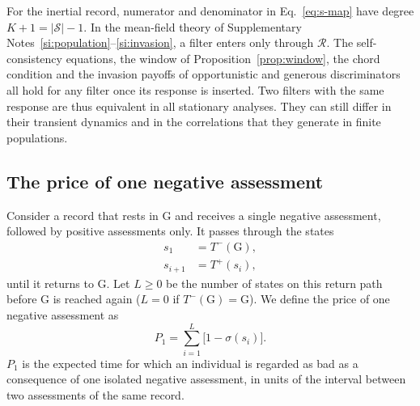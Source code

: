\documentclass[10pt]{wlscirep}
\newcommand{\Rmap}{\mathscr{R}}            %
\newcommand{\st}[1]{\mathrm{#1}}           %
\newcommand{\Pone}{P_{1}}                  %
\theoremstyle{plain}
\theoremstyle{remark}
\begin{document}
For the inertial record, numerator and denominator in Eq.~\eqref{eq:s-map} have degree $K+1=|\mathcal S|-1$. In the mean-field theory of Supplementary Notes~\ref{si:population}--\ref{si:invasion}, a filter enters only through $\Rmap$. The self-consistency equations, the window of Proposition~\ref{prop:window}, the chord condition and the invasion payoffs of opportunistic and generous discriminators all hold for any filter once its response is inserted. Two filters with the same response are thus equivalent in all stationary analyses. They can still differ in their transient dynamics and in the correlations that they generate in finite populations.

\subsection{The price of one negative assessment}

Consider a record that rests in $\st G$ and receives a single negative assessment, followed by positive assessments only. It passes through the states
\begin{equation}
\begin{aligned}
s_1&=T^-(\st G),\\
s_{i+1}&=T^+(s_i),
\end{aligned}
\label{eq:s-return-path}
\end{equation}
until it returns to $\st G$. Let $L\geq0$ be the number of states on this return path before $\st G$ is reached again ($L=0$ if $T^-(\st G)=\st G$). We define the price of one negative assessment as
\begin{equation}
\Pone=\sum_{i=1}^{L}\bigl[1-\sigma(s_i)\bigr].
\label{eq:s-price}
\end{equation}
$\Pone$ is the expected time for which an individual is regarded as bad as a consequence of one isolated negative assessment, in units of the interval between two assessments of the same record.
\end{document}

